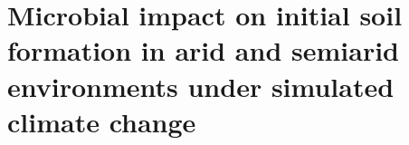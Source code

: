 \chapter{Microbial impact on initial soil formation in arid and semiarid environments under simulated climate change}
\label{chap:manuscript3} %